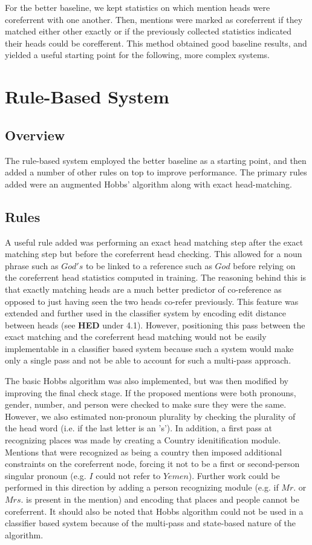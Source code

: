 \documentclass[12pt,a4paper]{article}
\begin{document}
For the better baseline, we kept statistics on which mention heads were coreferrent with one another.  Then, mentions were marked as coreferrent if they matched either other exactly or if the previously collected statistics indicated their heads could be corefferent.  This method obtained good baseline results, and yielded a useful starting point for the following, more complex systems.

\section{Rule-Based System}

\subsection{Overview}

The rule-based system employed the better baseline as a starting point, and then added a number of other rules on top to improve performance.  The primary rules added were an augmented Hobbs' algorithm along with exact head-matching.

\subsection{Rules}

A useful rule added was performing an exact head matching step after the exact matching step but before the coreferrent head checking.  This allowed for a noun phrase such as $God's$ to be linked to a reference such as $God$ before relying on the coreferrent head statistics computed in training.  The reasoning behind this is that exactly matching heads are a much better predictor of co-reference as opposed to just having seen the two heads co-refer previously.  This feature was extended and further used in the classifier system by encoding edit distance between heads (see \textbf{HED} under 4.1).  However, positioning this pass between the exact matching and the coreferrent head matching would not be easily implementable in a classifier based system because such a system would make only a single pass and not be able to account for such a multi-pass approach.

The basic Hobbs algorithm was also implemented, but was then modified by improving the final check stage.  If the proposed mentions were both pronouns, gender, number, and person were checked to make sure they were the same.  However, we also estimated non-pronoun plurality by checking the plurality of the head word (i.e. if the last letter is an 's').  In addition, a first pass at recognizing places was made by creating a Country idenitification module.  Mentions that were recognized as being a country then imposed additional constraints on the coreferrent node, forcing it not to be a first or second-person singular pronoun (e.g. $I$ could not refer to $Yemen$).  Further work could be performed in this direction by adding a person recognizing module (e.g. if $Mr.$ or $Mrs.$ is present in the mention) and encoding that places and people cannot be coreferrent.  It should also be noted that Hobbs algorithm could not be used in a classifier based system because of the multi-pass and state-based nature of the algorithm.
\end{document}

